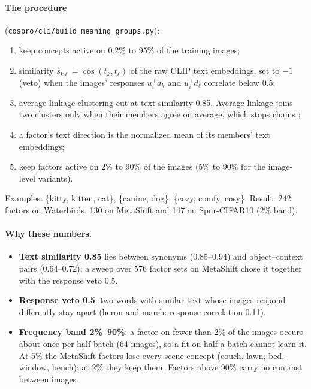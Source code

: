 \documentclass[11pt]{article}
\begin{document}
\paragraph{The procedure} (\texttt{cospro/cli/build\_meaning\_groups.py}):
\begin{enumerate}[leftmargin=*]
\item keep concepts active on 0.2\% to 95\% of the training images;
\item similarity $s_{k\ell}=\cos(t_k,t_\ell)$ of the raw CLIP text embeddings, set to $-1$ (veto) when the
images' responses $u_i^\top d_k$ and $u_i^\top d_\ell$ correlate below 0.5;
\item average-linkage clustering cut at text similarity 0.85. Average linkage joins two clusters only when
their members agree on average, which stops chains \citep{murtagh2012hierarchical};
\item a factor's text direction is the normalized mean of its members' text embeddings;
\item keep factors active on 2\% to 90\% of the images (5\% to 90\% for the image-level variants).
\end{enumerate}
Examples: \{kitty, kitten, cat\}, \{canine, dog\}, \{cozy, comfy, cosy\}. Result: 242 factors on Waterbirds, 130 on
MetaShift and 147 on Spur-CIFAR10 (2\% band).

\paragraph{Why these numbers.}
\begin{itemize}[leftmargin=*]
\item \textbf{Text similarity 0.85} lies between synonyms (0.85--0.94) and object--context pairs (0.64--0.72); a
sweep over 576 factor sets on MetaShift chose it together with the response veto 0.5.
\item \textbf{Response veto 0.5}: two words with similar text whose images respond differently stay apart
(heron and marsh: response correlation 0.11).
\item \textbf{Frequency band 2\%--90\%}: a factor on fewer than 2\% of the images occurs about once per
half batch (64 images), so a fit on half a batch cannot learn it. At 5\% the MetaShift factors lose every
scene concept (couch, lawn, bed, window, bench); at 2\% they keep them. Factors above 90\% carry no contrast
between images.
\end{itemize}

\end{document}
